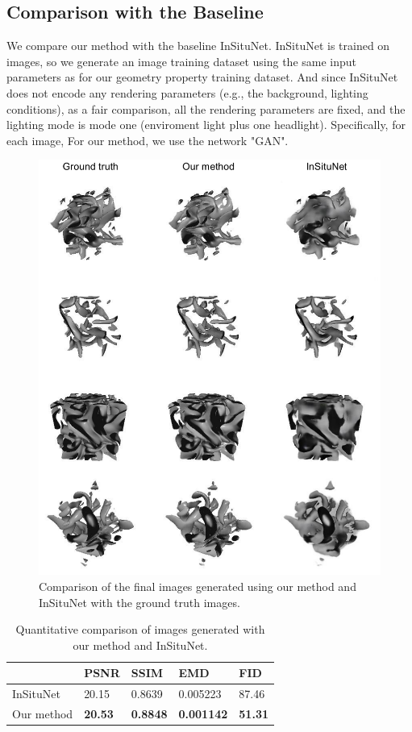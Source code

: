 \documentclass[journal]{vgtc}                %
\begin{document}
\subsection{Comparison with the Baseline}
We compare our method with the baseline InSituNet.  InSituNet is trained on images, so we generate an image training dataset using the same input parameters as for our geometry property training dataset. And since InSituNet does not encode any rendering parameters (e.g., the background, lighting conditions), as a fair comparison, all the rendering parameters are fixed, and the lighting mode is mode one (enviroment light plus one headlight). Specifically, for each image,  For our method, we use the network "GAN". 

\begin{figure}
  \centering
  \includegraphics[width=1\linewidth]{baseline}
  \caption{Comparison of the final images generated using our method and InSituNet with the ground truth images. }
  \label{fig:baseline}
\end{figure}

\begin{table}
\caption{Quantitative comparison of images generated with our method and InSituNet. }
    \centering
    \begin{tabular}{l|l|l|l|l}
         & PSNR & SSIM & EMD & FID \\  \hline
         InSituNet & 20.15 & 0.8639 & 0.005223 & 87.46   \\ \hline
         Our method & \textbf{20.53} & \textbf{0.8848} & \textbf{0.001142} & \textbf{51.31}  \\ 
    \end{tabular}
    \label{table:baseline}
\end{table}
\end{document}
